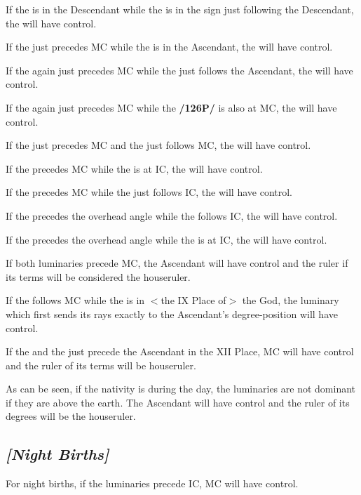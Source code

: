 If the \Moon\xspace is in the Descendant while the \Sun\xspace is in the sign just following the Descendant, the \Sun\xspace will have control. 

If the \Sun\xspace just precedes MC while the \Moon\xspace
is in the Ascendant, the \Moon\xspace will have control. 

If the \Sun\xspace again just precedes MC while the \Moon\xspace just follows the Ascendant, the \Moon\xspace will have control. 

If the \Sun\xspace again just precedes MC while the \Moon\xspace \textbf{/126P/} is also at MC, the \Moon\xspace will have control. 

If the \Sun\xspace just precedes MC and the \Moon\xspace just follows MC, the \Moon\xspace will have control. 

If the \Moon\xspace precedes MC while the \Sun\xspace is at IC, the \Sun\xspace will have control. 

If the \Moon\xspace precedes MC while the \Sun\xspace just follows IC, the \Sun\xspace will have control. 

If the \Sun\xspace precedes the overhead angle while the \Moon\xspace follows IC, the \Moon\xspace will have control. 

If the \Sun\xspace precedes the overhead angle while the \Moon\xspace is at IC, the \Moon\xspace will have control. 

If both luminaries precede MC, the Ascendant will have control and the ruler if its terms will be considered the houseruler. 

If the \Moon\xspace follows MC while the \Sun\xspace is in $<$the IX Place of$>$ the God, the luminary which first sends its rays exactly to the Ascendant’s degree-position will have control. 

If the \Sun\xspace and the \Moon\xspace just precede the Ascendant in the XII Place, MC will have control and the ruler of its terms will be houseruler.

As can be seen, if the nativity is during the day, the luminaries are not dominant if they are above the earth. The Ascendant will have control and the ruler of its degrees will be the houseruler. 

\subsection{\textit{[Night Births]}}

For night births, if the luminaries precede IC, MC will have control. 

